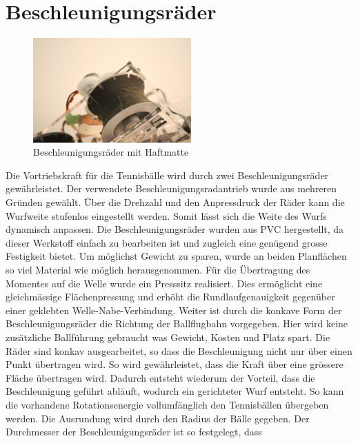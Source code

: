 \section{Beschleunigungsräder}
    \begin{figure}
         	\includegraphics[width=0.54\textwidth,clip,trim=20mm 0mm 20mm 35mm]
         	{Enddokumentation/Bilder/Haftmatte.JPG}
         	\centering
         	\caption{Beschleunigungsräder mit Haftmatte}
         	\label{abb:BeschleunigungsräderMitHaftmatte}
    \end{figure}        
    Die Vortriebskraft für die Tennisbälle wird durch zwei Beschleunigungsräder gewährleistet. Der verwendete
    Beschleunigungsradantrieb wurde aus mehreren Gründen gewählt. Über die Drehzahl und den 
    Anpressdruck der Räder kann die Wurfweite stufenlos eingestellt werden. Somit lässt sich die Weite des Wurfs dynamisch anpassen. Die Beschleunigungsräder wurden 
    aus PVC hergestellt, da dieser Werkstoff einfach zu bearbeiten ist und zugleich eine genügend 
    grosse Festigkeit bietet. Um möglichst Gewicht zu sparen, wurde an beiden Planflächen so 
    viel Material wie möglich herausgenommen. Für die Übertragung des Momentes auf die Welle wurde 
    ein Presssitz realisiert. Dies ermöglicht eine gleichmässige Flächenpressung und erhöht die 
    Rundlaufgenauigkeit gegenüber einer geklebten Welle-Nabe-Verbindung. Weiter ist durch die konkave Form der 
    Beschleunigungsräder die Richtung der Ballflugbahn vorgegeben. Hier wird keine zusätzliche Ballführung 
    gebraucht was Gewicht, Kosten und Platz spart. Die Räder sind konkav ausgearbeitet, so dass die 
    Beschleunigung nicht nur über einen Punkt übertragen wird. So wird gewährleistet, dass die Kraft 
    über eine grössere Fläche übertragen wird. Dadurch entsteht wiederum der Vorteil, dass die 
    Beschleunigung geführt abläuft, wodurch ein gerichteter Wurf entsteht. So kann die vorhandene 
    Rotationsenergie vollumfänglich den Tennisbällen übergeben werden. Die Ausrundung wird durch 
    den Radius der Bälle gegeben. Der Durchmesser der Beschleunigungsräder ist so festgelegt, dass 
